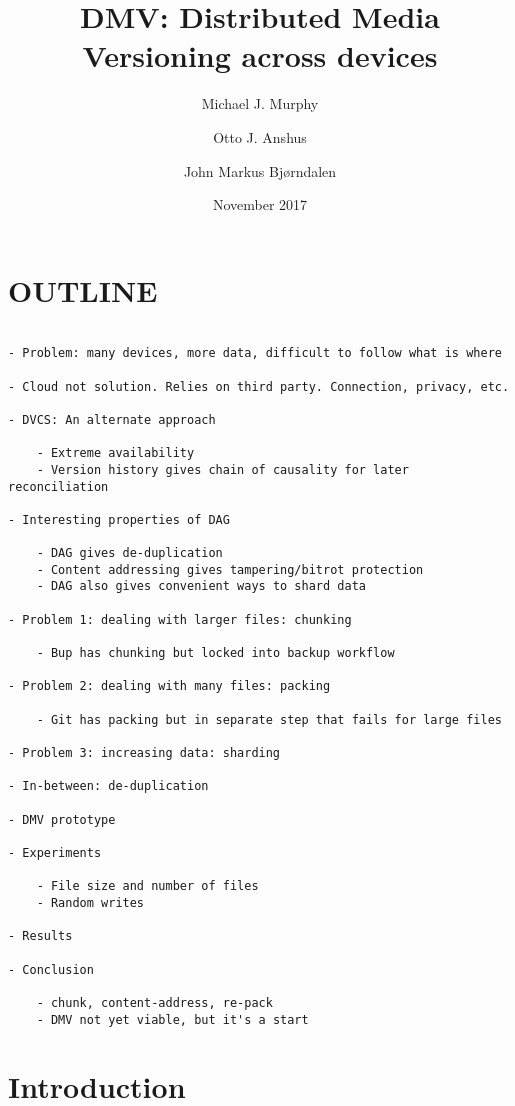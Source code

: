 \documentclass[
    usenglish,
]{nik}
\title{DMV: Distributed Media Versioning across devices}
\author{Michael J. Murphy \and Otto J. Anshus \and John Markus Bjørndalen}
\date{November 2017}
\begin{document}
\maketitle

\begin{abstract}

\end{abstract}

\section*{OUTLINE}

\begin{verbatim}

- Problem: many devices, more data, difficult to follow what is where

- Cloud not solution. Relies on third party. Connection, privacy, etc.

- DVCS: An alternate approach

    - Extreme availability
    - Version history gives chain of causality for later reconciliation

- Interesting properties of DAG

    - DAG gives de-duplication
    - Content addressing gives tampering/bitrot protection
    - DAG also gives convenient ways to shard data

- Problem 1: dealing with larger files: chunking

    - Bup has chunking but locked into backup workflow

- Problem 2: dealing with many files: packing

    - Git has packing but in separate step that fails for large files

- Problem 3: increasing data: sharding

- In-between: de-duplication

- DMV prototype

- Experiments

    - File size and number of files
    - Random writes

- Results

- Conclusion

    - chunk, content-address, re-pack
    - DMV not yet viable, but it's a start

\end{verbatim}

\section{Introduction}
\end{document}
